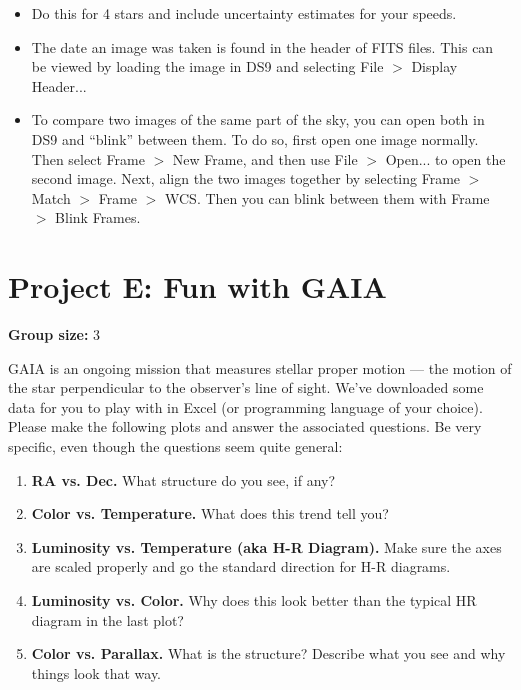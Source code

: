 \begin{itemize}
	\item Do this for 4 stars and include uncertainty estimates for your speeds.
\end{itemize}

\begin{itemize}
	\item The date an image was taken is found in the header of FITS files. This can be viewed by loading the image in DS9 and selecting File $>$ Display Header...
	
	\item To compare two images of the same part of the sky, you can open both in DS9 and ``blink'' between them. To do so, first open one image normally. Then select Frame $>$ New Frame, and then use File $>$ Open... to open the second image. Next, align the two images together by selecting Frame $>$ Match $>$ Frame $>$ WCS. Then you can blink between them with Frame $>$ Blink Frames.
\end{itemize}

\section{Project E: Fun with GAIA}

\textbf{Group size:} 3

GAIA is an ongoing mission that measures stellar proper motion --- the motion of the star perpendicular to the observer’s line of sight. We’ve downloaded some data for you to play with in Excel (or programming language of your choice). Please make the following plots and answer the associated questions. Be very specific, even though the questions seem quite general:

\begin{enumerate}
	\item \textbf{RA vs. Dec.} What structure do you see, if any?
	
	\item \textbf{Color vs. Temperature.} What does this trend tell you?
	
	\item \textbf{Luminosity vs. Temperature (aka H-R Diagram).} Make sure the axes are scaled properly and go the standard direction for H-R diagrams.
	
	\item \textbf{Luminosity vs. Color.} Why does this look better than the typical HR diagram in the last plot?
	
	\item \textbf{Color vs. Parallax.} What is the structure? Describe what you see and why things look that way.
\end{enumerate}


